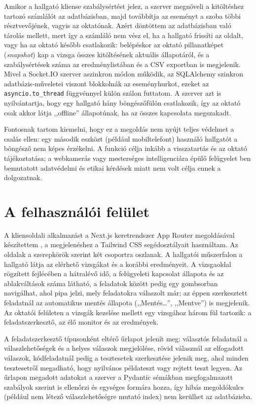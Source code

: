 Amikor a hallgató kliense szabálysértést jelez, a szerver megnöveli a kitöltéshez tartozó
számlálót az adatbázisban, majd továbbítja az eseményt a szoba többi résztvevőjének, vagyis az
oktatónak. Azért döntöttem az adatbázisban való tárolás mellett, mert így a számláló nem vész el,
ha a hallgató frissíti az oldalt, vagy ha az oktató később csatlakozik: belépéskor az oktató
pillanatképet (\textit{snapshot}) kap a vizsga összes kitöltésének aktuális állapotáról, és a
szabálysértések száma az eredménylistában és a CSV exportban is megjelenik. Mivel a Socket.IO
szerver aszinkron módon működik, az SQLAlchemy szinkron adatbázis-műveletei viszont blokkolnák az
eseményhurkot, ezeket az \texttt{asyncio.to\_thread} függvénnyel külön szálon futtatom. A szerver
azt is nyilvántartja, hogy egy hallgató hány böngészőfülön csatlakozik, így az oktató csak akkor
látja ,,offline'' állapotúnak, ha az összes kapcsolata megszakadt.

Fontosnak tartom kiemelni, hogy ez a megoldás nem nyújt teljes védelmet a csalás ellen: egy
második eszközt (például mobiltelefont) használó hallgatót a böngésző nem képes érzékelni. A
funkció célja inkább a visszatartás és az oktató tájékoztatása; a webkamerás vagy
mesterséges intelligenciára épülő felügyelet ben bemutatott adatvédelmi és
etikai kérdések miatt nem volt célja ennek a dolgozatnak.

\section{A felhasználói felület}
\label{sec:felulet}

A kliensoldali alkalmazást a Next.js keretrendszer App Router megoldásával készítettem
\cite{nextjs_docs}, a megjelenéshez a Tailwind CSS segédosztályait használtam. Az oldalak a
szerepkörök szerint két csoportra oszlanak. A hallgatói műszerfalon a hallgató látja az elérhető
vizsgákat és a korábbi eredményeit. A vizsgaoldal rögzített fejlécében a hátralévő idő, a
felügyeleti kapcsolat állapota és az ablakváltások száma látható, a feladatok között pedig egy
gombsorban navigálhat, ahol pipa jelzi, mely feladatokra válaszolt már; az éppen szerkesztett
feladatnál az automatikus mentés állapota (,,Mentés\ldots'', ,,Mentve'') is megjelenik. Az oktatói felületen a vizsgák kezelése mellett egy vizsgához három fül tartozik: a
feladatszerkesztő, az élő monitor és az eredmények.

A feladatszerkesztő típusonként eltérő űrlapot jelenít meg: választós feladatnál a
válaszlehetőségek és a helyes válaszok megjelölése, rövid válasznál az elfogadott válaszok,
kódfeladatnál pedig a tesztesetek szerkesztése jelenik meg, ahol minden tesztesetről megadható,
hogy nyilvános példateszt vagy rejtett teszt legyen. Az űrlapon megadott adatokat a szerver a
Pydantic sémákban megfogalmazott szabályok szerint is ellenőrzi és egységes formára hozza, így
hibás megoldókulcs (például nem létező válaszlehetőségre mutató index) nem kerülhet az
adatbázisba.

